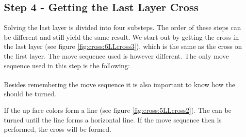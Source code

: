 \subsection{Step 4 - Getting the Last Layer Cross}\label{sub:step4}
Solving the last layer is divided into four substeps. The order of these steps can be different and still yield the same result. We start out by getting the cross in the last layer (see figure \ref{fig:cross:6LLcross3}), which is the same as the cross on the first layer. The move sequence used is however different. The only move sequence used in this step is the following: \\

 \\

Besides remembering the move sequence it is also important to know how the \cube{} should be turned.

If the up face colors form a line (see figure \ref{fig:cross:5LLcross2}). The \cube{} can be turned until the line forms a horizontal line. If the move sequence then is performed, the cross will be formed.


